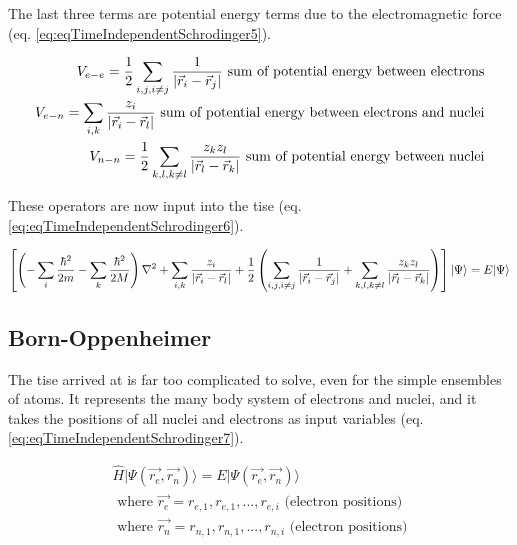 The last three terms are potential energy terms due to the electromagnetic force (eq. \ref{eq:eqTimeIndependentSchrodinger5}). 

\begin{equation}
\begin{split}
V_{e-e} = \frac{1}{2} \sum_{i,j,i \neq j} \frac{1}{\abs{\vec{r}_i - \vec{r}_j}} \text{  sum of potential energy between electrons} \\
V_{e-n} = \sum_{i,k} \frac{z_i}{\abs{\vec{r}_i - \vec{r}_l}} \text{  sum of potential energy between electrons and nuclei} \\
V_{n-n} = \frac{1}{2} \sum_{k,l,k \neq l} \frac{z_k z_l}{\abs{\vec{r}_l - \vec{r}_k}} \text{  sum of potential energy between nuclei}
\end{split}
\label{eq:eqTimeIndependentSchrodinger5}
\end{equation}

These operators are now input into the \acrshort{tise} (eq. \ref{eq:eqTimeIndependentSchrodinger6}).


\begin{equation}
\begin{split}
\left[ \left(- \sum_{i} \frac{\hbar^2}{2 m} - \sum_{k} \frac{\hbar^2}{2 M} \right) \nabla^2  + \sum_{i,k} \frac{z_i}{\abs{\vec{r}_i - \vec{r}_l}} + \frac{1}{2} \left( \sum_{i,j,i \neq j} \frac{1}{\abs{\vec{r}_i - \vec{r}_j}} + \sum_{k,l,k \neq l} \frac{z_k z_l}{\abs{\vec{r}_l - \vec{r}_k}} \right) \right] \lvert \Psi \rangle = E \lvert \Psi \rangle
\end{split}
\label{eq:eqTimeIndependentSchrodinger6}
\end{equation}



\subsection{Born-Oppenheimer}

The \acrshort{tise} arrived at is far too complicated to solve, even for the simple ensembles of atoms.  It represents the many body system of electrons and nuclei, and it takes the positions of all nuclei and electrons as input variables (eq. \ref{eq:eqTimeIndependentSchrodinger7}).

\begin{equation}
\begin{split}
\hat{H} \lvert \Psi (\vec{r_e}, \vec{r_n}) \rangle = E \lvert \Psi (\vec{r_e}, \vec{r_n}) \rangle \\
\text{ where } \vec{r_e} = r_{e,1}, r_{e,1},...,r_{e,i} \text{ (electron positions)} \\
\text{ where } \vec{r_n} = r_{n,1}, r_{n,1},...,r_{n,i} \text{ (electron positions)} \\
\end{split}
\label{eq:eqTimeIndependentSchrodinger7}
\end{equation}

